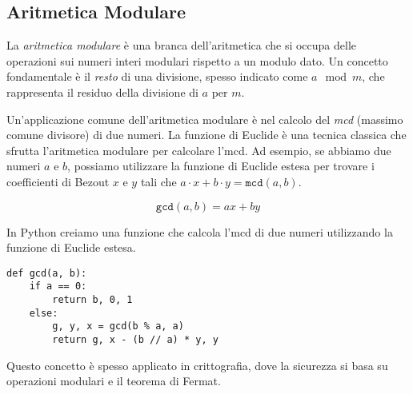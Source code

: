 \subsection{Aritmetica Modulare}

La \emph{aritmetica modulare} è una branca dell'aritmetica che si
occupa delle operazioni sui numeri interi modulari rispetto a un modulo
dato. Un concetto fondamentale è il \emph{resto} di una divisione, spesso indicato come $a \mod m$, che rappresenta
il residuo della divisione di $a$ per $m$.

Un'applicazione comune dell'aritmetica modulare è nel calcolo del \emph{mcd} (massimo comune divisore) di due numeri.
La funzione di Euclide è una tecnica classica che sfrutta l'aritmetica modulare per calcolare l'mcd. Ad esempio,
se abbiamo due numeri $a$ e $b$, possiamo utilizzare la funzione di Euclide estesa per trovare i coefficienti di
Bezout $x$ e $y$ tali che $a \cdot x + b \cdot y = \texttt{mcd}(a, b)$.

\begin{equation}
\texttt{gcd}(a, b) = ax + by
\end{equation}

In Python creiamo una funzione che calcola l'mcd di due numeri utilizzando la funzione di Euclide estesa.

\begin{lstlisting}[style=pythonStyle]
def gcd(a, b):
    if a == 0:
        return b, 0, 1
    else:
        g, y, x = gcd(b % a, a)
        return g, x - (b // a) * y, y
\end{lstlisting}

Questo concetto è spesso applicato in crittografia, dove la sicurezza si basa su operazioni modulari e il teorema di Fermat.

